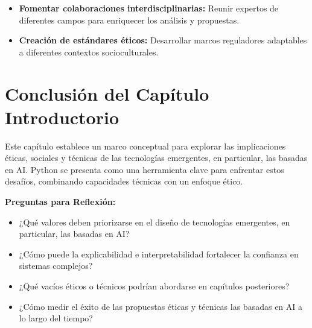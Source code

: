 \begin{refsection}
\begin{itemize}
        \item \textbf{Fomentar colaboraciones interdisciplinarias:}  
    Reunir expertos de diferentes campos para enriquecer los análisis y propuestas.

    \item \textbf{Creación de estándares éticos:}  
    Desarrollar marcos reguladores adaptables a diferentes contextos socioculturales.

\end{itemize}


\section{Conclusión del Capítulo Introductorio}

Este capítulo establece un marco conceptual para explorar las implicaciones éticas, sociales y técnicas de las tecnologías emergentes, en particular, las basadas en AI. Python se presenta como una herramienta clave para enfrentar estos desafíos, combinando capacidades técnicas con un enfoque ético.





\textbf{Preguntas para Reflexión:}

\begin{itemize}
    \item ¿Qué valores deben priorizarse en el diseño de tecnologías emergentes, en particular, las basadas en AI?
    \item ¿Cómo puede la explicabilidad e interpretabilidad fortalecer la confianza en sistemas complejos?
    \item ¿Qué vacíos éticos o técnicos podrían abordarse en capítulos posteriores?
    \item ¿Cómo medir el éxito de las propuestas éticas y técnicas las basadas en AI a lo largo del tiempo?

\end{itemize}


\nocite{*}

\printbibliography[heading=subbibliography, title={Bibliografía del Capítulo 1}]
\end{refsection}


